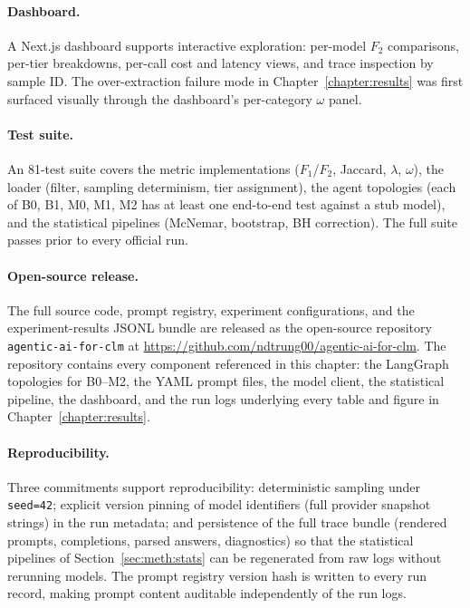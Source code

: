 \paragraph{Dashboard.}
A Next.js dashboard supports interactive exploration: per-model $F_2$ comparisons,
per-tier breakdowns, per-call cost and latency views, and trace inspection by sample
ID. The over-extraction failure mode in Chapter~\ref{chapter:results} was first
surfaced visually through the dashboard's per-category $\omega$ panel.

\paragraph{Test suite.}
An 81-test suite covers the metric implementations ($F_1$/$F_2$, Jaccard,
$\lambda$, $\omega$), the loader (filter, sampling determinism, tier
assignment), the agent topologies (each of B0, B1, M0, M1, M2 has at least one
end-to-end test against a stub model), and the statistical pipelines
(McNemar, bootstrap, BH correction). The full suite passes prior to every
official run.

\paragraph{Open-source release.}\label{sec:sys:opensource}
The full source code, prompt registry, experiment configurations, and the
experiment-results JSONL bundle are released as the open-source repository
\texttt{agentic-ai-for-clm} at
\url{https://github.com/ndtrung00/agentic-ai-for-clm}. The repository contains
every component referenced in this chapter: the LangGraph topologies for
B0--M2, the YAML prompt files, the model client, the statistical pipeline,
the dashboard, and the run logs underlying every table and figure in
Chapter~\ref{chapter:results}.

\paragraph{Reproducibility.}
Three commitments support reproducibility: deterministic sampling under
\texttt{seed=42}; explicit version pinning of model identifiers (full provider
snapshot strings) in the run metadata; and persistence of the full trace bundle
(rendered prompts, completions, parsed answers, diagnostics) so that the statistical
pipelines of Section~\ref{sec:meth:stats} can be regenerated from raw logs without
rerunning models. The prompt registry version hash is written to every run record,
making prompt content auditable independently of the run logs.
